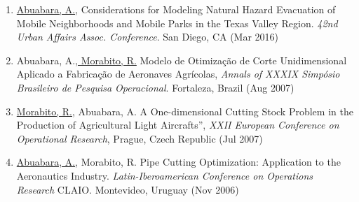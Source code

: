 \documentclass[11pt,oneside]{article}
\begin{document}
\begin{enumerate}[leftmargin=40pt]
\item \underline{Abuabara, A.}, Considerations for Modeling Natural Hazard Evacuation of Mobile Neighborhoods and Mobile Parks in the Texas Valley Region. \emph{42nd Urban Affairs Assoc. Conference}. San Diego, CA (Mar 2016)
\item Abuabara, A.,\underline{ Morabito, R.} Modelo de Otimização de Corte Unidimensional Aplicado a Fabricação de Aeronaves Agrícolas, \emph{Annals of XXXIX Simpósio Brasileiro de Pesquisa Operacional}. Fortaleza, Brazil (Aug 2007)
\item \underline{Morabito, R.}, Abuabara, A. A One-dimensional Cutting Stock Problem in the Production of Agricultural Light Aircrafts”, \emph{XXII European Conference on Operational Research}, Prague, Czech Republic (Jul 2007)
\item \underline{Abuabara, A.}, Morabito, R. Pipe Cutting Optimization: Application to the Aeronautics Industry. \emph{Latin-Iberoamerican Conference on Operations Research} CLAIO. Montevideo, Uruguay (Nov 2006)
\end{enumerate}
\end{document}
